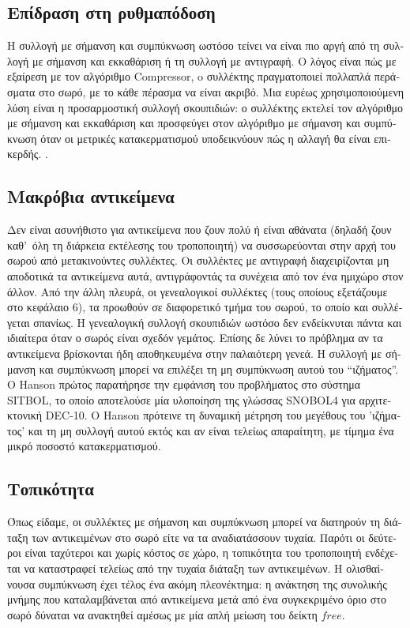 \begin{greek}
\subsection{Επίδραση στη ρυθμαπόδοση}
Η συλλογή με σήμανση και συμπύκνωση ωστόσο τείνει να είναι πιο αργή από τη 
συλλογή με σήμανση και εκκαθάριση ή τη συλλογή με αντιγραφή. Ο λόγος είναι πώς 
με εξαίρεση με τον αλγόριθμο Compressor, o συλλέκτης πραγματοποιεί πολλαπλά 
περάσματα στο σωρό, με το κάθε πέρασμα να είναι ακριβό. Μια ευρέως χρησιμοποιούμενη
λύση είναι η προσαρμοστική συλλογή σκουπιδιών: ο συλλέκτης εκτελεί τον αλγόριθμο
με σήμανση και εκκαθάριση και προσφεύγει στον αλγόριθμο με σήμανση και συμπύκνωση
όταν οι μετρικές κατακερματισμού υποδεικνύουν πώς η αλλαγή θα είναι επικερδής.
\cite{DBLP:conf/jvm/Printezis01, DBLP:conf/iwmm/SomanKB04}.   

\subsection{Μακρόβια αντικείμενα}
Δεν είναι ασυνήθιστο για αντικείμενα που ζουν πολύ ή είναι αθάνατα (δηλαδή ζουν
καθ'~όλη τη διάρκεια εκτέλεσης του τροποποιητή) να συσσωρεύονται στην αρχή του
σωρού από μετακινούντες συλλέκτες. Οι συλλέκτες με αντιγραφή διαχειρίζονται μη
αποδοτικά τα αντικείμενα αυτά, αντιγράφοντάς τα συνέχεια από τον ένα ημιχώρο
στον άλλον. Από την άλλη πλευρά, οι γενεαλογικοί συλλέκτες (τους οποίους
εξετάζουμε στο κεφάλαιο 6), τα προωθούν σε διαφορετικό τμήμα του σωρού, το
οποίο και συλλέγεται σπανίως. Η γενεαλογική συλλογή σκουπιδιών ωστόσο δεν
ενδείκνυται πάντα και ιδιαίτερα όταν ο σωρός είναι σχεδόν γεμάτος. Επίσης δε
λύνει το πρόβλημα αν τα αντικείμενα βρίσκονται ήδη αποθηκευμένα στην παλαιότερη
γενεά. Η συλλογή με σήμανση και συμπύκνωση μπορεί να επιλέξει τη μη συμπύκνωση
αυτού του ``ιζήματος''. O Hanson \cite{DBLP:journals/spe/Hanson77} πρώτος
παρατήρησε την εμφάνιση του προβλήματος στο σύστημα SITBOL, το οποίο αποτελούσε
μία υλοποίηση της γλώσσας SNOBOL4 για αρχιτεκτονική DEC-10. O Hanson πρότεινε
τη δυναμική μέτρηση του μεγέθους του 'ιζήματος' και τη μη συλλογή αυτού εκτός
και αν είναι τελείως απαραίτητη, με τίμημα ένα μικρό ποσοστό κατακερματισμού.

\subsection{Τοπικότητα}
Όπως είδαμε, οι συλλέκτες με σήμανση και συμπύκνωση μπορεί να διατηρούν τη
διάταξη των αντικειμένων στο σωρό είτε να τα αναδιατάσσουν τυχαία. Παρότι
οι δεύτεροι είναι ταχύτεροι και χωρίς κόστος σε χώρο, η τοπικότητα του
τροποποιητή ενδέχεται να καταστραφεί τελείως από την τυχαία διάταξη των
αντικειμένων. Η ολισθαίνουσα συμπύκνωση έχει τέλος ένα ακόμη πλεονέκτημα:
η ανάκτηση της συνολικής μνήμης που καταλαμβάνεται από αντικείμενα μετά
από ένα συγκεκριμένο όριο στο σωρό δύναται να ανακτηθεί αμέσως με μία απλή
μείωση του δείκτη $free$.


\end{greek}
